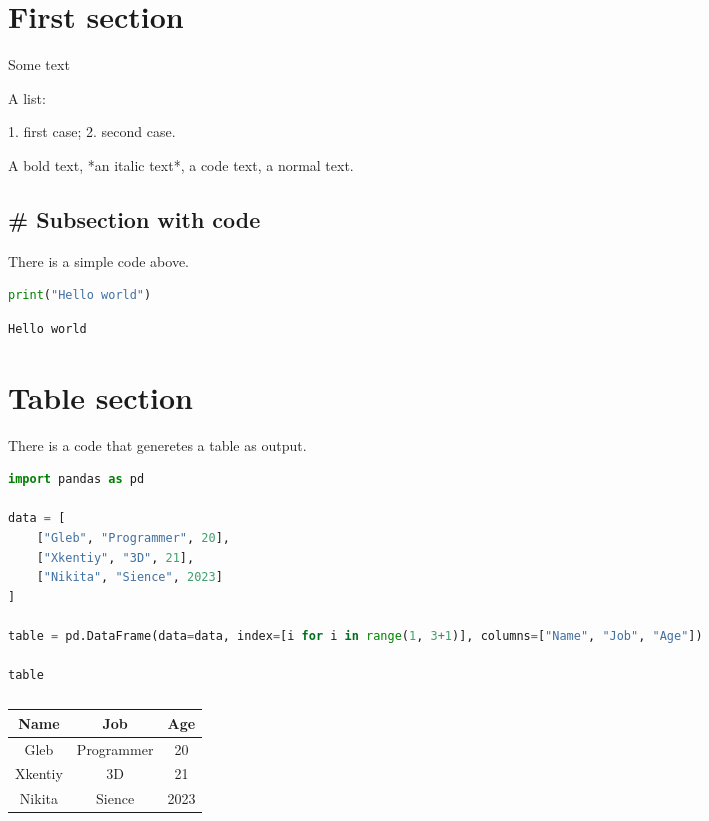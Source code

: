 \section{ First section}


Some text

A list:


1.   first case;
2.   second case.

A bold text, *an italic text*, a code text, a normal text.

\subsection{# Subsection with code}


There is a simple code above.

\begin{lstlisting}[language={Python},caption={}]
print("Hello world")
\end{lstlisting}


\begin{lstlisting}[language={},caption={Результат выполнения программы}]
Hello world

\end{lstlisting}

\section{ Table section}


There is a code that generetes a table as output.

\begin{lstlisting}[language={Python},caption={}]
import pandas as pd

data = [
    ["Gleb", "Programmer", 20],
    ["Xkentiy", "3D", 21],
    ["Nikita", "Sience", 2023]
]

table = pd.DataFrame(data=data, index=[i for i in range(1, 3+1)], columns=["Name", "Job", "Age"])

table
\end{lstlisting}


\begin{table}[h!]
    \centering
    \caption{}
    \begin{tabular}{|c|c|c|}
    \hline
Name & Job & Age \\ \hline
Gleb & Programmer & 20 \\
Xkentiy & 3D & 21 \\
Nikita & Sience & 2023 \\

	\hline
    \end{tabular}
    \label{tab:my\_label}
\end{table}

